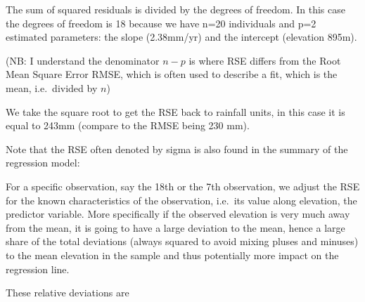\documentclass[
  letterpaper,
  DIV=11,
  numbers=noendperiod]{scrreprt}
\newenvironment{Shaded}{\begin{snugshade}}{\end{snugshade}}
\newcommand{\CommentTok}[1]{\textcolor[rgb]{0.37,0.37,0.37}{#1}}
\newcommand{\DecValTok}[1]{\textcolor[rgb]{0.68,0.00,0.00}{#1}}
\newcommand{\FunctionTok}[1]{\textcolor[rgb]{0.28,0.35,0.67}{#1}}
\newcommand{\NormalTok}[1]{\textcolor[rgb]{0.00,0.23,0.31}{#1}}
\newcommand{\OtherTok}[1]{\textcolor[rgb]{0.00,0.23,0.31}{#1}}
\newcommand{\SpecialCharTok}[1]{\textcolor[rgb]{0.37,0.37,0.37}{#1}}
\begin{document}
The sum of squared residuals is divided by the degrees of freedom. In
this case the degrees of freedom is 18 because we have n=20 individuals
and p=2 estimated parameters: the slope (2.38mm/yr) and the intercept
(elevation 895m).

(NB: I understand the denominator \(n-p\) is where RSE differs from the
Root Mean Square Error RMSE, which is often used to describe a fit,
which is the mean, i.e.~divided by \(n\))

We take the square root to get the RSE back to rainfall units, in this
case it is equal to 243mm (compare to the RMSE being 230 mm).

\begin{Shaded}
\end{Shaded}

Note that the RSE often denoted by sigma is also found in the summary of
the regression model:

\begin{Shaded}
\end{Shaded}

For a specific observation, say the 18th or the 7th observation, we
adjust the RSE for the known characteristics of the observation,
i.e.~its value along elevation, the predictor variable. More
specifically if the observed elevation is very much away from the mean,
it is going to have a large deviation to the mean, hence a large share
of the total deviations (always squared to avoid mixing pluses and
minuses) to the mean elevation in the sample and thus potentially more
impact on the regression line.

These relative deviations are
\end{document}
